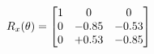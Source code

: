 \documentclass[preview]{standalone}
\begin{document}
\begin{align*}
\special{dvisvgm:raw <g id='unique000'>}R_{x}(\theta) = \begin{bmatrix}1 & 0 & 0 \\0 & -0.85 & -0.53 \\0 & +0.53 & -0.85\end{bmatrix}\special{dvisvgm:raw </g>}
\end{align*}
\end{document}
